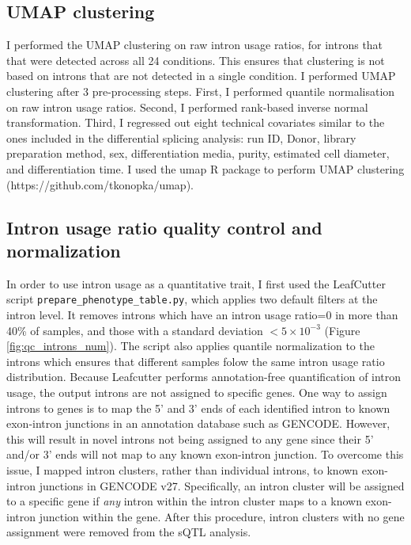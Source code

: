 \subsection{UMAP clustering}
I performed the UMAP clustering on raw intron usage ratios, for introns that that were detected across all 24 conditions. This ensures that clustering is not based on introns that are not detected in a single condition. I performed UMAP clustering after 3 pre-processing steps. First, I performed quantile normalisation on raw intron usage ratios. Second, I performed rank-based inverse normal transformation. Third, I regressed out eight technical covariates similar to the ones included in the differential splicing analysis: run ID, Donor, library preparation method, sex, differentiation media, purity, estimated cell diameter, and differentiation time. I used the umap R package to perform UMAP clustering (https://github.com/tkonopka/umap). 

\subsection{Intron usage ratio quality control and normalization}
In order to use intron usage as a quantitative trait, I first used the LeafCutter script \linebreak \Verb+prepare_phenotype_table.py+, which applies two default filters at the intron level. It removes introns which have an intron usage ratio=0 in more than 40\% of samples, and those with a standard deviation $< 5\times10^{-3}$ (Figure \ref{fig:qc_introns_num}). The script also applies quantile normalization to the introns which ensures that different samples folow the same intron usage ratio distribution. Because Leafcutter performs annotation-free quantification of intron usage, the output introns are not assigned to specific genes. One way to assign introns to genes is to map the 5' and 3' ends of each identified intron to known exon-intron junctions in an annotation database such as GENCODE. However, this will result in novel introns not being assigned to any gene since their 5' and/or 3' ends will not map to any known exon-intron junction. To overcome this issue, I mapped intron clusters, rather than individual introns, to known exon-intron junctions in GENCODE v27. Specifically, an intron cluster will be assigned to a specific gene if \textit{any} intron within the intron cluster maps to a known exon-intron junction within the gene. After this procedure, intron clusters with no gene assignment were removed from the sQTL analysis. 

